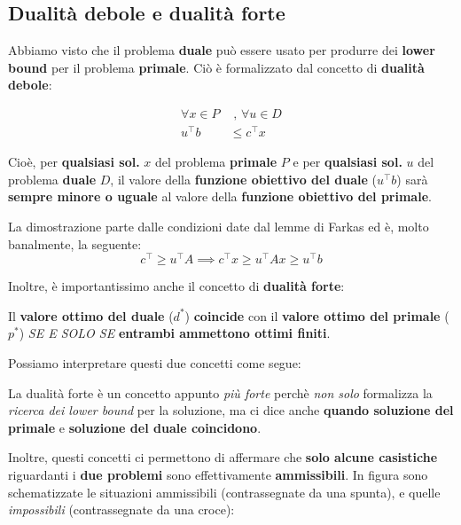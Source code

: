 \subsection{Dualità debole e dualità forte}

Abbiamo visto che il problema \textbf{duale} può essere usato per
produrre dei \textbf{lower bound} per il problema \textbf{primale}.
Ciò è formalizzato dal concetto di \textbf{dualità debole}:

\begin{prop}
    \[
        \begin{aligned}
            \forall x\in P &\text{ , } \forall u \in D \\ 
            u^\top b  &\le c^\top x
        \end{aligned}
    \] 
\end{prop}

Cioè, per \textbf{qualsiasi sol.} $x$ del problema \textbf{primale} $P$ e
per \textbf{qualsiasi sol.} $u$ del problema \textbf{duale} $D$, 
il valore della \textbf{funzione obiettivo del duale} ($u^\top b$) sarà 
\textbf{sempre minore o uguale} al valore della \textbf{funzione obiettivo del primale}.

La dimostrazione parte dalle condizioni date dal lemme di Farkas ed è, molto 
banalmente, la seguente:
\[
    c^\top \ge u^\top A \implies c^\top x \ge u^\top A x \ge u^\top b
\]

Inoltre, è importantissimo anche il concetto di \textbf{dualità forte}:

\begin{prop}
    Il \textbf{valore ottimo del duale} ($d^*$) \textbf{coincide} con il
    \textbf{valore ottimo del primale} ($p^*$) \textit{SE E SOLO SE}
    \textbf{entrambi ammettono ottimi finiti}.
\end{prop}

Possiamo interpretare questi due concetti come segue:

\begin{remark}
    La dualità forte è un concetto appunto \textit{più forte} perchè \textit{non solo}
    formalizza la \textit{ricerca dei lower bound} per la soluzione, ma ci dice anche 
    \textbf{quando soluzione del primale} e \textbf{soluzione del duale coincidono}.
\end{remark}

Inoltre, questi concetti ci permettono di affermare che \textbf{solo alcune casistiche}
riguardanti i \textbf{due problemi} sono effettivamente \textbf{ammissibili}.
In figura sono schematizzate le situazioni ammissibili (contrassegnate da una spunta), e
quelle \textit{impossibili} (contrassegnate da una croce):

